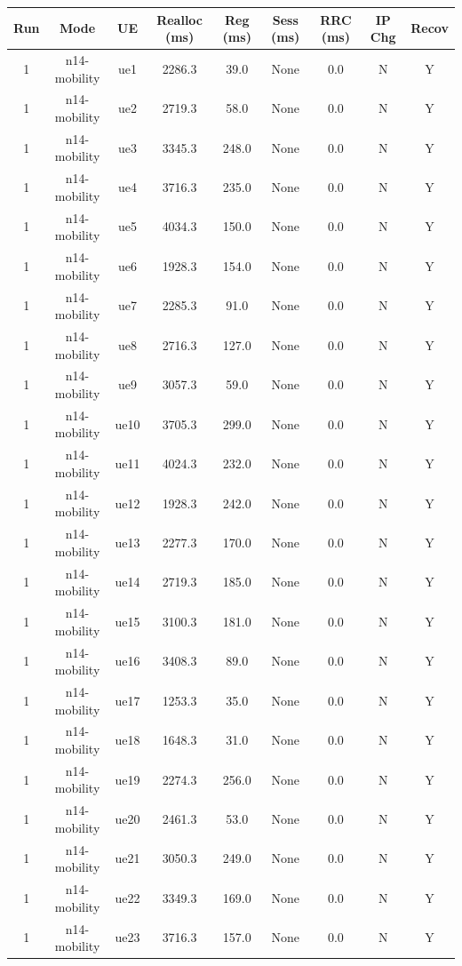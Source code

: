 \begin{table}[ht]
\centering
\begin{tabular}{|c|c|c|c|c|c|c|c|c|}
\hline
Run & Mode & UE & Realloc (ms) & Reg (ms) & Sess (ms) & RRC (ms) & IP Chg & Recov \\
\hline
1 & n14-mobility & ue1 & 2286.3 & 39.0 & None & 0.0 & N & Y \\
1 & n14-mobility & ue2 & 2719.3 & 58.0 & None & 0.0 & N & Y \\
1 & n14-mobility & ue3 & 3345.3 & 248.0 & None & 0.0 & N & Y \\
1 & n14-mobility & ue4 & 3716.3 & 235.0 & None & 0.0 & N & Y \\
1 & n14-mobility & ue5 & 4034.3 & 150.0 & None & 0.0 & N & Y \\
1 & n14-mobility & ue6 & 1928.3 & 154.0 & None & 0.0 & N & Y \\
1 & n14-mobility & ue7 & 2285.3 & 91.0 & None & 0.0 & N & Y \\
1 & n14-mobility & ue8 & 2716.3 & 127.0 & None & 0.0 & N & Y \\
1 & n14-mobility & ue9 & 3057.3 & 59.0 & None & 0.0 & N & Y \\
1 & n14-mobility & ue10 & 3705.3 & 299.0 & None & 0.0 & N & Y \\
1 & n14-mobility & ue11 & 4024.3 & 232.0 & None & 0.0 & N & Y \\
1 & n14-mobility & ue12 & 1928.3 & 242.0 & None & 0.0 & N & Y \\
1 & n14-mobility & ue13 & 2277.3 & 170.0 & None & 0.0 & N & Y \\
1 & n14-mobility & ue14 & 2719.3 & 185.0 & None & 0.0 & N & Y \\
1 & n14-mobility & ue15 & 3100.3 & 181.0 & None & 0.0 & N & Y \\
1 & n14-mobility & ue16 & 3408.3 & 89.0 & None & 0.0 & N & Y \\
1 & n14-mobility & ue17 & 1253.3 & 35.0 & None & 0.0 & N & Y \\
1 & n14-mobility & ue18 & 1648.3 & 31.0 & None & 0.0 & N & Y \\
1 & n14-mobility & ue19 & 2274.3 & 256.0 & None & 0.0 & N & Y \\
1 & n14-mobility & ue20 & 2461.3 & 53.0 & None & 0.0 & N & Y \\
1 & n14-mobility & ue21 & 3050.3 & 249.0 & None & 0.0 & N & Y \\
1 & n14-mobility & ue22 & 3349.3 & 169.0 & None & 0.0 & N & Y \\
1 & n14-mobility & ue23 & 3716.3 & 157.0 & None & 0.0 & N & Y \\

\end{tabular}
\end{table}
